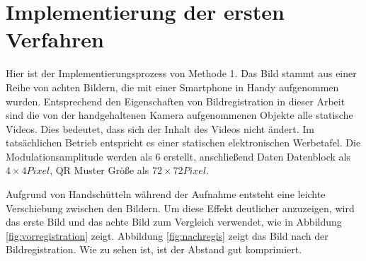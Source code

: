 \section{Implementierung der ersten Verfahren}
Hier ist der Implementierungsprozess von Methode 1. Das Bild stammt aus einer Reihe von  achten Bildern, die mit einer Smartphone in Handy aufgenommen wurden. Entsprechend den Eigenschaften von Bildregistration in dieser Arbeit sind die von der handgehaltenen Kamera aufgenommenen Objekte alle statische Videos. Dies bedeutet, dass sich der Inhalt des Videos nicht ändert. Im tatsächlichen Betrieb entspricht es einer statischen elektronischen Werbetafel. Die Modulationsamplitude werden als 6 erstellt, anschließend Daten Datenblock als $ 4 \times 4 Pixel$, QR Muster Größe  als $ 72 \times 72 Pixel$.

Aufgrund von Handschütteln während der Aufnahme entsteht eine leichte Verschiebung zwischen den Bildern. Um diese Effekt deutlicher anzuzeigen, wird das erste Bild und das achte Bild zum Vergleich verwendet, wie in Abbildung \ref{fig:vorregistration} zeigt. 
Abbildung \ref{fig:nachregis} zeigt das Bild nach der Bildregistration. Wie zu sehen ist, ist der Abstand gut komprimiert. %
 
